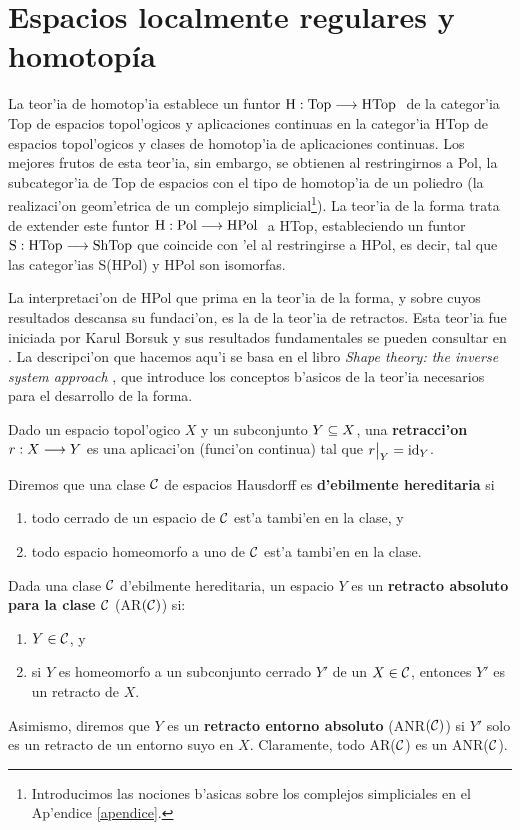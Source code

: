 \chapter{Espacios localmente regulares y homotopía}\label{anrs}

La teor'ia de homotop'ia establece un funtor $ \text{H}:\text{Top}\longrightarrow \text{HTop } $ de la categor'ia Top de espacios topol'ogicos y aplicaciones continuas en la categor'ia  HTop de espacios topol'ogicos y clases de homotop'ia de aplicaciones continuas. Los mejores frutos de esta teor'ia, sin embargo, se obtienen al restringirnos a Pol, la subcategor'ia de Top de espacios con el tipo de homotop'ia de un poliedro (la realizaci'on geom'etrica de un complejo simplicial\footnote{Introducimos las nociones b'asicas sobre los complejos simpliciales en el Ap'endice \ref{apendice}.}). La teor'ia de la forma trata de extender este funtor $\text{H}:\text{Pol}\longrightarrow \text{HPol }  $ a HTop, estableciendo un funtor $ \text{S}: \text{HTop}\longrightarrow \text{ShTop} $ que coincide con 'el al restringirse a HPol, es decir, tal que las categor'ias S(HPol) y HPol son isomorfas.

La interpretaci'on de HPol que prima en la teor'ia de la forma, y sobre cuyos resultados descansa su fundaci'on, es la de la teor'ia de retractos. Esta teor'ia fue iniciada por Karul Borsuk \cite{Borsuk1931SurLR,borsuk1932klasse} y sus resultados fundamentales se pueden consultar en \cite{hu1965theory,borsuk1967theory}. La descripci'on que hacemos aqu'i se basa en el libro \textit{Shape theory: the inverse system approach} \cite{mardešić1982shape}, que introduce los conceptos b'asicos de la teor'ia necesarios para el desarrollo de la forma.

Dado un espacio topol'ogico $ X $ y un subconjunto $ Y\subseteq X  $, una  \textbf{retracci'on} $ r:X\longrightarrow Y  $ es una aplicaci'on (funci'on continua) tal que $ \rest{r}{Y} = \id_Y  $. 


\begin{definition}
  Diremos que una clase $ \mathcal{C}  $ de espacios Hausdorff es \textbf{d'ebilmente hereditaria} si 
  \begin{enumerate}
    \item todo cerrado de un espacio de $ \mathcal{C}  $ est'a tambi'en en la clase, y
    \item todo espacio homeomorfo a uno de $ \mathcal{C}  $ est'a tambi'en en la clase.
  \end{enumerate}
\end{definition}

Dada una clase $ \mathcal{C}  $ d'ebilmente hereditaria, un espacio $ Y  $ es un \textbf{retracto absoluto para la clase $ \mathcal{C}  $} (AR$ (\mathcal{C}) $) si:
\begin{enumerate}
  \item $ Y\in \mathcal{C}  $, y
  \item  si $ Y  $ es homeomorfo a un subconjunto cerrado $ Y'  $ de un $ X\in \mathcal{C}  $, entonces $ Y' $ es un retracto de $ X  $.
\end{enumerate}
Asimismo, diremos que $ Y  $ es un \textbf{retracto entorno absoluto} (ANR$ (\mathcal{C}) $) si $ Y'  $ solo es un retracto de un entorno suyo en $ X  $. Claramente, todo AR($ \mathcal{C}  $) es un ANR($ \mathcal{C}  $).

